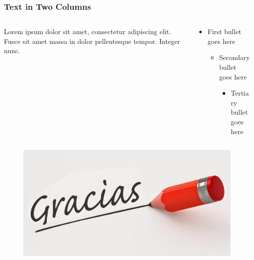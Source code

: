 \documentclass[10pt,xcolor={table,dvipsnames},t]{beamer}
\begin{document}
\begin{frame}
\frametitle{Text in Two Columns}

\begin{columns}[T]

\begin{column}{0.48\textwidth}
\small
Lorem ipsum dolor sit amet, consectetur adipiscing elit. Fusce sit amet massa in dolor pellentesque tempor. Integer nunc. 
\end{column}

\begin{column}{0.48\textwidth}
\begin{itemize}
\item First bullet goes here
  \begin{itemize}
  \item Secondary bullet goes here
    \begin{itemize}
    \item Tertiary bullet goes here
    \end{itemize}
  \end{itemize}
\end{itemize}
\end{column}

\end{columns}
\end{frame}

\begin{frame}
\begin{figure}[posicion1]
\centering
\includegraphics[width=1.01\textwidth,height=.80\textheight]{gracias}
\end{figure}
\end{frame}
\end{document}
